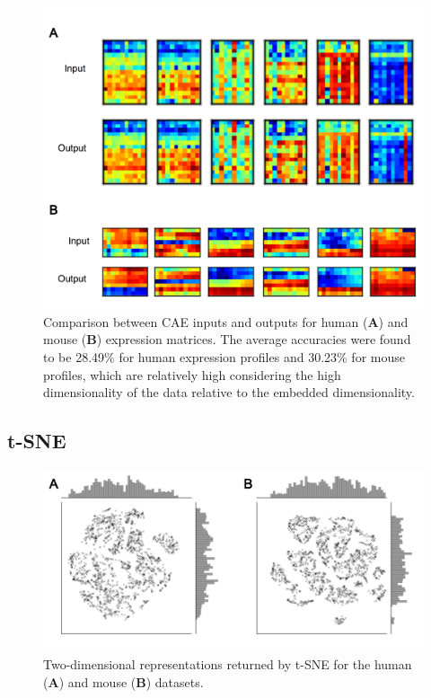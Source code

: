 \documentclass[12pt,oneside,onecolumn,a4paper]{article}
\begin{document}
\begin{figure}[H]
\begin{center}
\includegraphics[width=\columnwidth]{figures/input_output}
\caption{Comparison between CAE inputs and outputs for human (\textbf{A}) and mouse (\textbf{B}) expression matrices. The average accuracies were found to be 28.49\% for human expression profiles and 30.23\% for mouse profiles, which are relatively high considering the high dimensionality of the data relative to the embedded dimensionality. \label{fig:input_output}%
}
\end{center}
\end{figure}

\subsection{t-SNE}

\begin{figure}[H]
\begin{center}
\includegraphics[width=\columnwidth]{figures/raw_coords}
\caption{Two-dimensional representations returned by t-SNE for the human (\textbf{A}) and mouse (\textbf{B}) datasets. \label{fig:tsne_scatter}%
}
\end{center}
\end{figure}
\end{document}
